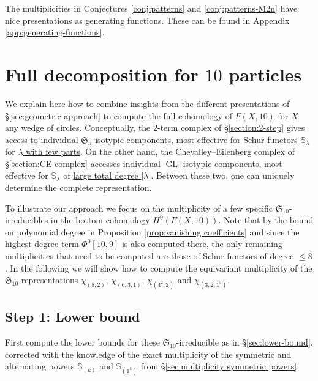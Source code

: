 \documentclass[12pt]{article}
\newcommand{\SymGroup}[1][n]{\mathfrak{S}_{#1}}
\newcommand{\Specht}[1]{\chi_{#1}}
\newcommand{\Schur}[1]{\mathbb{S}_{#1}}
\DeclareMathOperator{\GL}{GL}
\theoremstyle{plain}
\theoremstyle{definition}
\theoremstyle{remark}
\begin{document}
The multiplicities in Conjectures \ref{conj:patterns} and \ref{conj:patterns-M2n} have nice presentations as generating functions. These can be found in Appendix \ref{app:generating-functions}.

\newpage

\appendix
\section{Full decomposition for \texorpdfstring{$10$}{10} particles} \label{app:full-computation}

We explain here how to combine insights from the different presentations of \S\ref{sec:geometric approach} to compute the full cohomology of $F(X, 10)$ for $X$ any wedge of circles. Conceptually, the $2$-term complex of \S\ref{section:2-step} gives access to individual $\SymGroup$-isotypic components, most effective for Schur functors $\Schur{\lambda}$ for \underline{$\lambda$ with few parts}. On the other hand, the Chevalley--Eilenberg complex of \S\ref{section:CE-complex} accesses individual $\GL$-isotypic components, most effective for $\Schur{\lambda}$ of \underline{large total degree $|\lambda|$}. Between these two, one can uniquely determine the complete representation.

To illustrate our approach we focus on the multiplicity of a few specific $\SymGroup[10]$-irreducibles in the bottom cohomology $H^{9}(F(X,10))$. Note that by the bound on polynomial degree in Proposition \ref{prop:vanishing coefficients} and since the highest degree term $\Phi^0[10,9]$ is also computed there, the only remaining multiplicities that need to be computed are those of Schur functors of degree $\leq 8$. In the following we will show how to compute the equivariant multiplicity of the $\SymGroup[10]$-representations $\Specht{(8,2)}$, $\Specht{(6,3,1)}$, $\Specht{(4^2,2)}$ and $\Specht{(3,2,1^5)}$.

\subsection*{Step 1: Lower bound}

First compute the lower bounds for these $\SymGroup[10]$-irreducible as in \S\ref{sec:lower-bound}, corrected with the knowledge of the exact multiplicity of the symmetric and alternating powers $\Schur{(k)}$ and $\Schur{(1^k)}$ from \S\ref{sec:multiplicity symmetric powers}:
\end{document}
